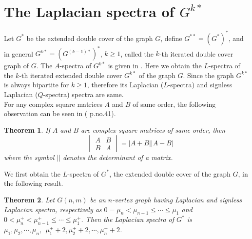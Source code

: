 \documentclass[12pt,a4paper]{amsart}
\newtheorem{theorem}{Theorem}[section]
\theoremstyle{theorem}
\theoremstyle{definition}
\numberwithin{equation}{section} \makeatletter
\begin{document}
\section{The Laplacian spectra of $G^{k*}$}

Let $G^*$ be the extended double cover of the graph $G$, define $G^{**}=(G^*)^*$, and in general $G^{k*}=(G^{(k-1)*})^*$, $k\geq 1$, called the $k$-th iterated double cover graph of $G$. The $A$-spectra of $G^{k*}$ is given in \cite{c}. Here we obtain the $L$-spectra of the $k$-th iterated extended double cover $G^{k*}$ of the graph $G$. Since the graph $G^{k*}$ is always bipartite for $k\geq 1$, therefore its Laplacian ($L$-spectra) and signless Laplacian ($Q$-spectra) spectra are same.\\
\indent For any complex square matrices $A$ and $B$ of same order, the following observation can be seen in (\cite{fz} p.no.{41}).
\begin{theorem}
If $A$ and $B$ are complex square matrices of same order, then
$$\quad
\begin{vmatrix}
A & B\\
B & A
\end{vmatrix}
=|A+B||A-B|$$
\indent where the symbol $| |$ denotes the determinant of a matrix.
\end{theorem}
\indent We first obtain the $L$-spectra of $G^*$, the extended double cover of the graph $G$, in the following result.
\begin{theorem}
Let $G(n,m)$ be an $n$-vertex graph having Laplacian and signless Laplacian spectra, respectively as $0=\mu_n<\mu_{n-1}\leq\cdots\leq\mu_1$ and $0<\mu^+_n<\mu_{n-1}^+\leq\cdots\leq\mu_1^+$. Then the Laplacian spectra of $G^*$ is $\mu_1, \mu_2, \cdots, \mu_n,~~ \mu_1^{+}+2, \mu_2^{+}+2, \cdots, \mu_n^{+}+2$.
\end{theorem}
\end{document}
